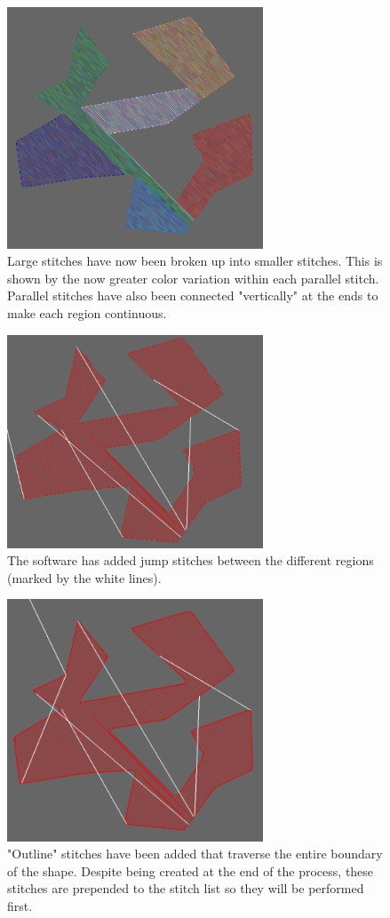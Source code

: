 \documentclass{article}
\begin{document}
\begin{figure}[H]
    \centering
    \includegraphics[width=3in]{p5}
    \caption{Large stitches have now been broken up into smaller stitches. This is shown by the now greater color variation within each parallel stitch. Parallel stitches have also been connected "vertically" at the ends to make each region continuous.}
    \label{p5}
\end{figure}

\begin{figure}[H]
    \centering
    \includegraphics[width=3in]{p6}
    \caption{The software has added jump stitches between the different regions (marked by the white lines).}
    \label{p6}
\end{figure}

\begin{figure}[H]
    \centering
    \includegraphics[width=3in]{p7}
    \caption{"Outline" stitches have been added that traverse the entire boundary of the shape. Despite being created at the end of the process, these stitches are prepended to the stitch list so they will be performed first.}
    \label{p7}
\end{figure}
\end{document}
